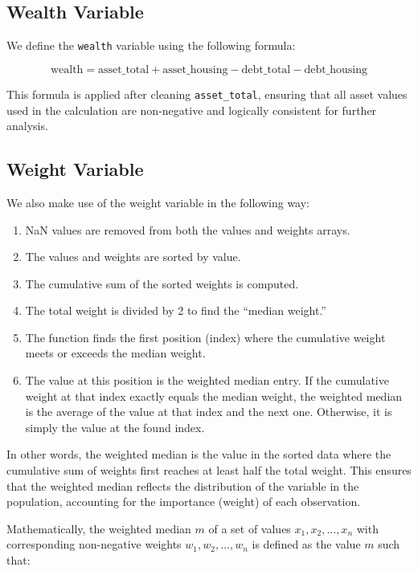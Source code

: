\documentclass[
  12pt]{article}
\providecommand{\tightlist}{%
  \setlength{\itemsep}{0pt}\setlength{\parskip}{0pt}}\usepackage{longtable,booktabs,array}
\begin{document}
\subsection{Wealth Variable}\label{wealth-variable}

We define the \texttt{wealth} variable using the following formula:

\[
    \text{wealth} = \text{asset\_total} + \text{asset\_housing} - \text{debt\_total} - \text{debt\_housing}
\]

This formula is applied after cleaning \texttt{asset\_total}, ensuring
that all asset values used in the calculation are non-negative and
logically consistent for further analysis.

\subsection{Weight Variable}\label{weight-variable}

We also make use of the weight variable in the following way:

\begin{enumerate}
\def\labelenumi{\arabic{enumi}.}
\tightlist
\item
  NaN values are removed from both the values and weights arrays.
\item
  The values and weights are sorted by value.
\item
  The cumulative sum of the sorted weights is computed.
\item
  The total weight is divided by 2 to find the ``median weight.''
\item
  The function finds the first position (index) where the cumulative
  weight meets or exceeds the median weight.
\item
  The value at this position is the weighted median entry. If the
  cumulative weight at that index exactly equals the median weight, the
  weighted median is the average of the value at that index and the next
  one. Otherwise, it is simply the value at the found index.
\end{enumerate}

In other words, the weighted median is the value in the sorted data
where the cumulative sum of weights first reaches at least half the
total weight. This ensures that the weighted median reflects the
distribution of the variable in the population, accounting for the
importance (weight) of each observation.

Mathematically, the weighted median \(m\) of a set of values
\(x_1, x_2, \ldots, x_n\) with corresponding non-negative weights
\(w_1, w_2, \ldots, w_n\) is defined as the value \(m\) such that:
\end{document}
